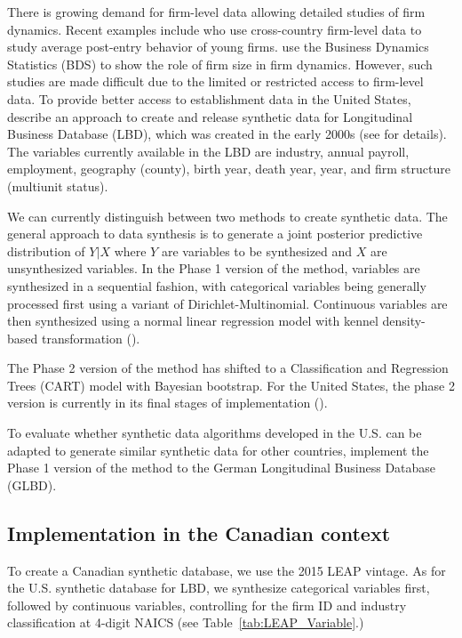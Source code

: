\documentclass{article}
\begin{document}
There is growing demand for firm-level data allowing detailed studies of firm dynamics. Recent examples include \textcite{NBERc0480} who use cross-country firm-level data to study average post-entry behavior of young firms. \textcite{10.1257/aer.20141280} use the Business Dynamics Statistics (BDS) to show the role of firm size in firm dynamics. However, such studies are made difficult due to the limited or restricted access to firm-level data. To provide better access to establishment data in the United States, \textcite{RePEc:bla:istatr:v:79:y:2011:i:3:p:362-384} describe an approach to create and release synthetic data for Longitudinal Business Database (LBD), which was created in the early 2000s (see \textcite{RePEc:cen:wpaper:02-17} for details). The variables currently available in the LBD are industry, annual payroll, employment, geography (county), birth year, death year, year, and firm structure (multiunit status).    

We can currently distinguish between two methods to create synthetic data. The general approach to data synthesis is to generate a joint posterior predictive distribution of $Y|X$ where $Y$ are variables to be synthesized and $X$ are unsynthesized variables. In the Phase 1 version of the method, variables are synthesized in a sequential fashion, with categorical variables being generally processed first using a variant of Dirichlet-Multinomial. Continuous variables are then synthesized using a normal linear regression model with kennel density-based transformation (\textcite{WOODCOCK20094228}). 

The Phase 2 version of the method has shifted to a Classification and Regression Trees (CART) model with Bayesian bootstrap. For the United States, the phase 2 version  is currently in its final stages of implementation (\textcite{RePEc:cen:wpaper:14-12}). 

To evaluate whether synthetic data algorithms developed in the U.S. can be adapted to generate similar synthetic data for other countries, \textcite{RePEc:cen:wpaper:14-13} implement the Phase 1 version of the method to the German Longitudinal Business Database (GLBD). 

\subsection{Implementation in the Canadian context}

To create a Canadian synthetic database, we use the 2015 LEAP vintage. As for the U.S. synthetic database for LBD,  we synthesize categorical variables first, followed by continuous variables, controlling for the firm ID and industry classification at 4-digit NAICS (see Table~\ref{tab:LEAP_Variable}.)
\end{document}
